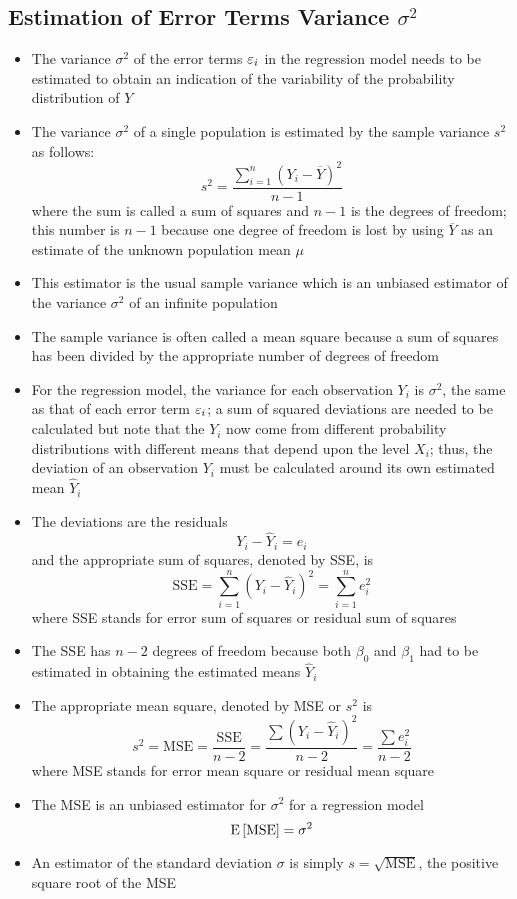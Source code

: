 \subsection{Estimation of Error Terms Variance $\sigma^2$}
\begin{itemize}
\item The variance $\sigma^2$ of the error terms $\varepsilon_i$ in the regression model needs to be estimated to obtain an indication of the variability of the probability distribution of $Y$
\item The variance $\sigma^2$ of a single population is estimated by the sample variance $s^2$ as follows: $$ s^2 = \frac{\sum_{i=1}^n (Y_i - \overline{Y})^2}{n-1} $$ where the sum is called a sum of squares and $n-1$ is the degrees of freedom; this number is $n-1$ because one degree of freedom is lost by using $\overline{Y}$ as an estimate of the unknown population mean $\mu$ 
\item This estimator is the usual sample variance which is an unbiased estimator of the variance $\sigma^2$ of an infinite population
\item The sample variance is often called a mean square because a sum of squares has been divided by the appropriate number of degrees of freedom
\item For the regression model, the variance for each observation $Y_i$ is $\sigma^2$, the same as that of each error term $\varepsilon_i$; a sum of squared deviations are needed to be calculated but note that the $Y_i$ now come from different probability distributions with different means that depend upon the level $X_i$; thus, the deviation of an observation $Y_i$ must be calculated around its own estimated mean $\hat{Y}_i$ 
\item The deviations are the residuals $$ Y_i - \hat{Y}_i = e_i $$ and the appropriate sum of squares, denoted by SSE, is $$ \text{SSE} = \sum_{i=1}^n (Y_i - \hat{Y}_i)^2 = \sum_{i=1}^n e_i^2 $$ where SSE stands for error sum of squares or residual sum of squares 
\item The SSE has $n-2$ degrees of freedom because both $\beta_0$ and $\beta_1$ had to be estimated in obtaining the estimated means $\hat{Y}_i$ 
\item The appropriate mean square, denoted by MSE or $s^2$ is $$ s^2 = \text{MSE} = \frac{\text{SSE}}{n-2} = \frac{\sum (Y_i - \hat{Y}_i)^2}{n-2} = \frac{\sum e_i^2}{n-2} $$ where MSE stands for error mean square or residual mean square
\item The MSE is an unbiased estimator for $\sigma^2$ for a regression model $$ \mathrm{E}\left[ \text{MSE} \right] = \sigma^2 $$ 
\item An estimator of the standard deviation $\sigma$ is simply $s=\sqrt{\text{MSE}}$, the positive square root of the MSE 
\end{itemize}

